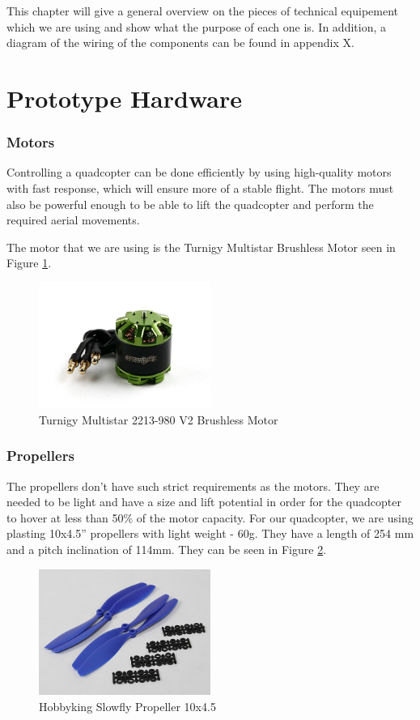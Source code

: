 This chapter will give a general overview on the pieces of technical equipement which we are using and show what the purpose of each one is. In addition, a diagram of the wiring of the components can be found in appendix X. %

\section{Prototype Hardware}

\subsubsection{Motors}
Controlling a quadcopter can be done efficiently by using high-quality motors with fast response, which will ensure more of a stable flight. The motors must also be powerful enough to be able to lift the quadcopter and perform the required aerial movements. 

The motor that we are using is the Turnigy Multistar Brushless Motor seen in Figure \ref{motor}.

\begin{figure}[H]
  \centering
    \includegraphics[width=0.5\textwidth]{images/motor.jpg}
	\caption{Turnigy Multistar 2213-980 V2 Brushless Motor}
	\label{motor}
\end{figure}

\subsubsection{Propellers}
The propellers don't have such strict requirements as the motors. They are needed to be light and have a size and lift potential in order for the quadcopter to hover at less than 50\% of the motor capacity. For our quadcopter, we are using plasting 10x4.5'' propellers with light weight - 60g. They have a length of 254 mm and a pitch inclination of 114mm. They can be seen in Figure \ref{propeller}.

\begin{figure}[H]
  \centering
    \includegraphics[width=0.5\textwidth]{images/propeller.jpg}
	\caption{Hobbyking Slowfly Propeller 10x4.5}
	\label{propeller}
\end{figure}

